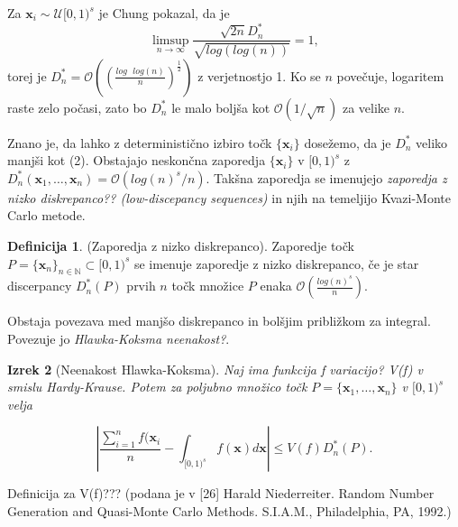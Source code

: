 \documentclass[12pt,a4paper, reqno]{amsart}
\theoremstyle{definition} %
\newtheorem{definicija}{Definicija}[section]
\theoremstyle{plain} %
\newtheorem{izrek}[definicija]{Izrek}
\newcommand{\N}{\mathbb N}
\newcommand{\geslo}[2]{\noindent\textbf{#1}\hspace*{3mm}\hangindent=\parindent\hangafter=1 #2}
\begin{document}
\vspace{3mm}
Za $\boldsymbol{x}_i \sim \mathcal{U}[0,1)^s$ je Chung pokazal, da je
\begin{equation}
\limsup_{n \to \infty} \frac{\sqrt{2n}D_n^*}{\sqrt{log (log(n))}} = 1,
\end{equation}
torej je $D_n^* = \mathcal{O}((\frac{log\mbox{ }log(n)}{n})^\frac{1}{2})$ z verjetnostjo 1. Ko se $n$ povečuje, logaritem raste zelo počasi, zato bo $D_n^*$ le malo boljša kot $\mathcal O(1/\sqrt{n})$ za velike $n$.
\vspace{3mm}

Znano je, da lahko z deterministično izbiro točk $\{\boldsymbol{x}_i \}$ dosežemo, da je $D_n^*$ veliko manjši kot (2).
Obstajajo neskončna zaporedja  $\{\boldsymbol{x}_i \}$ v $[0,1)^s$ z $D_n^*(\boldsymbol x_1,\ldots, \boldsymbol x_n) = \mathcal O(log(n)^s/n)$. Takšna zaporedja se imenujejo \textit{zaporedja z nizko diskrepanco?? (low-discepancy sequences)} in njih na temeljijo Kvazi-Monte Carlo metode.

\begin{definicija}{(Zaporedja z nizko diskrepanco)}.
Zaporedje točk $P = \{\boldsymbol x_n\}_{n\in \N} \subset [0,1)^s$ se imenuje zaporedje z nizko diskrepanco, če je star discerpancy  $D^*_n(P)$ prvih $n$ točk množice $P$ enaka $\mathcal{O}(\frac{log (n)^s}{n})$.
\end{definicija}

Obstaja povezava med manjšo diskrepanco in bolšjim približkom za integral. Povezuje jo \textit{Hlawka-Koksma neenakost?}.
\vspace{2mm}
\begin{izrek}[Neenakost Hlawka-Koksma]
Naj ima funkcija f variacijo? V(f) v smislu Hardy-Krause. Potem za poljubno množico točk $P = \{\boldsymbol{x}_1,\ldots,\boldsymbol{x}_n\}$ v $[0,1)^s$ velja

\begin{equation}
\left\lvert\frac{\sum_{i=1}^{n} f(\boldsymbol{x}_i}{n} - \int_{[0,1)^s} f(\boldsymbol{x})d\boldsymbol{x} \right\rvert \leq V(f)D_n^*(P).
\end{equation}
\end{izrek}
\vspace{4mm}

Definicija za V(f)??? (podana je v [26] Harald Niederreiter. Random Number Generation and Quasi-Monte Carlo
Methods. S.I.A.M., Philadelphia, PA, 1992.)



%
%




\end{document}
